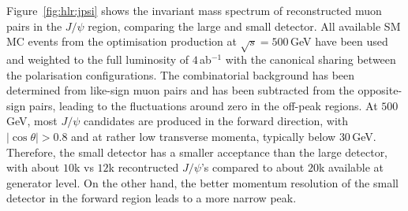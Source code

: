 Figure~\ref{fig:hlr:jpsi} shows the invariant mass spectrum of reconstructed muon pairs in the $J/\psi$ region, comparing the large and small detector. All available
SM MC events from the optimisation production at $\sqrt{s}=500$\,GeV have been used and weighted to the full luminosity of $4$\,ab$^{-1}$ with the canonical sharing between the polarisation configurations. The combinatorial background has been determined from like-sign muon pairs and has been subtracted from the opposite-sign pairs, leading to the fluctuations around zero in the off-peak regions.
At $500$\,GeV, most $J/\psi$ candidates are produced in the forward direction, with $|\cos{\theta}|>0.8$ and at rather low transverse momenta, typically below $30$\,GeV.
Therefore, the small detector has a smaller acceptance than the large detector, with about $10$k vs $12$k recontructed $J/\psi$'s compared to about $20$k available at generator level. On the other hand, the better momentum resolution of the small detector in the forward region leads to a more narrow peak.



